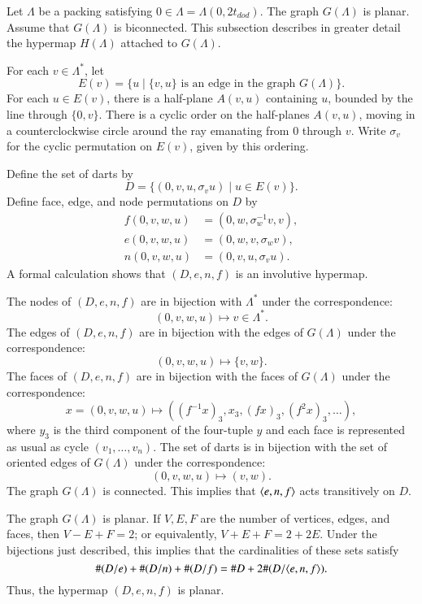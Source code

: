 \documentclass{article} %
\begin{document}
Let $\Lambda$ be a packing satisfying $0\in\Lambda=\Lambda(0,2t_{dod})$.  The graph
$G(\Lambda)$ is planar.   Assume that $G(\Lambda)$ is biconnected. 
This subsection describes in greater detail the
hypermap $H(\Lambda)$ attached to $G(\Lambda)$.

For each $v\in \Lambda^*$, let 
  $$E(v) = \{u \mid \{v,u\} \text{ is an edge in the graph } G(\Lambda)\}.$$
For each $u\in E(v)$, there is a half-plane $A(v,u)$ containing $u$, bounded by
the line through $\{0,v\}$.  There is a cyclic order on the half-planes $A(v,u)$,
moving in a counterclockwise circle around the ray emanating from $0$ through $v$.
Write $\sigma_v$ for the cyclic permutation on $E(v)$, given by this ordering.

Define the set of darts by
$$
D = \{(0,v,u,\sigma_v u) \mid u\in E(v)\}.
$$
Define face, edge, and node permutations on $D$ by
$$
\begin{array}{lll}
  f(0,v,w,u) &= (0,w,\sigma_w^{-1} v,v),\\
  e(0,v,w,u) &= (0,w,v,\sigma_w v),\\
  n(0,v,w,u) &= (0,v,u,\sigma_v u).
\end{array}
$$
A formal calculation shows that $(D,e,n,f)$ is an involutive hypermap.

The nodes of $(D,e,n,f)$ are in bijection with $\Lambda^*$ under the correspondence:
$$
  (0,v,w,u) \mapsto v\in\Lambda^*.
$$
The edges of $(D,e,n,f)$ are in bijection with the edges of $G(\Lambda)$ under the
correspondence:
$$
  (0,v,w,u) \mapsto \{v,w\}.
$$
The faces of $(D,e,n,f)$ are in bijection with the faces of $G(\Lambda)$ under the
correspondence:
$$
  x = (0,v,w,u) \mapsto ((f^{-1}x)_3,x_3,(f x)_3,(f^2 x)_3,\ldots),
$$
where $y_3$ is the third component of the four-tuple $y$ and each face is represented
as usual as cycle $(v_1,\ldots,v_n)$.
The set of darts is in bijection with the set of oriented edges of $G(\Lambda)$ under
the correspondence:
$$
(0,v,w,u)\mapsto (v,w).
$$
The graph $G(\Lambda)$ is connected.  This implies that $\langle e,n,f\rangle$ acts
transitively on $D$.

The graph $G(\Lambda)$ is planar.  If $V,E,F$ are the number of vertices, edges,
and faces, then $V-E+F=2$; or equivalently, $V+E+F = 2 + 2E$.
Under the bijections just described, this implies that the cardinalities
of these sets satisfy
$$
     \#(D/e) + \#(D/n) + \#(D/f) = \# D + 2\#(D/\langle e,n,f\rangle).
$$
Thus, the hypermap $(D,e,n,f)$ is planar.
\end{document}
